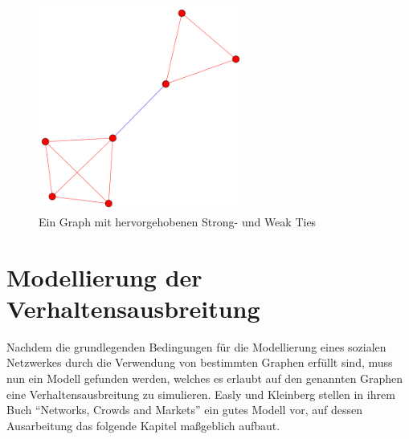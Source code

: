 \documentclass[12pt]{article}
\begin{document}
\begin{figure}
  \begin{center}
    \includegraphics[width=0.60\textwidth]{pic_tieGraph.png}
  \end{center}
  \caption{Ein Graph mit hervorgehobenen Strong- und Weak Ties}
  \label{pic_ties}
\end{figure}

 

\section{Modellierung der Verhaltensausbreitung}
Nachdem die grundlegenden Bedingungen für die Modellierung eines sozialen Netzwerkes durch die Verwendung von bestimmten Graphen erfüllt sind, muss nun ein Modell gefunden werden, welches es erlaubt auf den genannten Graphen eine Verhaltensausbreitung zu simulieren. Easly und Kleinberg stellen in ihrem Buch "`Networks, Crowds and Markets"' \cite{Easly10} ein gutes Modell vor, auf dessen Ausarbeitung das folgende Kapitel maßgeblich aufbaut.
\end{document}
